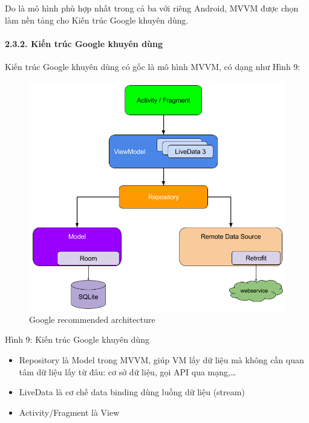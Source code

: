 \documentclass[
]{article}
\begin{document}
Do là mô hình phù hợp nhất trong cả ba với riêng Android, MVVM được chọn
làm nền tảng cho Kiến trúc Google khuyên dùng.

\hypertarget{kiux1ebfn-truxfac-google-khuyuxean-duxf9ng}{%
\paragraph{\texorpdfstring{2.3.2. Kiến trúc Google khuyên dùng
}{2.3.2. Kiến trúc Google khuyên dùng }}\label{kiux1ebfn-truxfac-google-khuyuxean-duxf9ng}}

Kiến trúc Google khuyên dùng có gốc là mô hình MVVM, có dạng như Hình 9:

\begin{figure}
\centering
\includegraphics{../images/final-architecture.png}
\caption{Google recommended architecture}
\end{figure}

Hình 9: Kiến trúc Google khuyên dùng

\begin{itemize}
\item
  Repository là Model trong MVVM, giúp VM lấy dữ liệu mà không cần quan
  tâm dữ liệu lấy từ đâu: cơ sở dữ liệu, gọi API qua mạng,\ldots{}
\item
  LiveData là cơ chế data binding dùng luồng dữ liệu (stream)
\item
  Activity/Fragment là View
\end{itemize}
\end{document}
